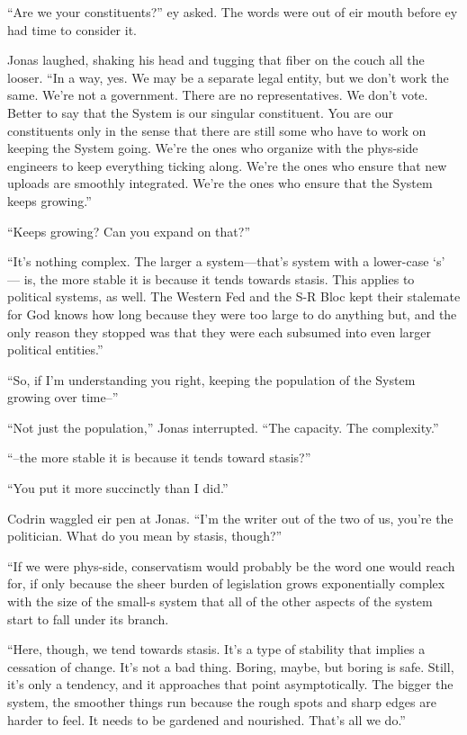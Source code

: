 ``Are we your constituents?'' ey asked. The words were out of eir mouth before ey had time to consider it.

Jonas laughed, shaking his head and tugging that fiber on the couch all the looser. ``In a way, yes. We may be a separate legal entity, but we don't work the same. We're not a government. There are no representatives. We don't vote. Better to say that the System is our singular constituent. You are our constituents only in the sense that there are still some who have to work on keeping the System going. We're the ones who organize with the phys-side engineers to keep everything ticking along. We're the ones who ensure that new uploads are smoothly integrated. We're the ones who ensure that the System keeps growing.''

``Keeps growing? Can you expand on that?''

``It's nothing complex. The larger a system---that's system with a lower-case `s' — is, the more stable it is because it tends towards stasis. This applies to political systems, as well. The Western Fed and the S-R Bloc kept their stalemate for God knows how long because they were too large to do anything but, and the only reason they stopped was that they were each subsumed into even larger political entities.''

``So, if I'm understanding you right, keeping the population of the System growing over time--''

``Not just the population,'' Jonas interrupted. ``The capacity. The complexity.''

``--the more stable it is because it tends toward stasis?''

``You put it more succinctly than I did.''

Codrin waggled eir pen at Jonas. ``I'm the writer out of the two of us, you're the politician. What do you mean by stasis, though?''

``If we were phys-side, conservatism would probably be the word one would reach for, if only because the sheer burden of legislation grows exponentially complex with the size of the small-s system that all of the other aspects of the system start to fall under its branch.

``Here, though, we tend towards stasis. It's a type of stability that implies a cessation of change. It's not a bad thing. Boring, maybe, but boring is safe. Still, it's only a tendency, and it approaches that point asymptotically. The bigger the system, the smoother things run because the rough spots and sharp edges are harder to feel. It needs to be gardened and nourished. That's all we do.''

